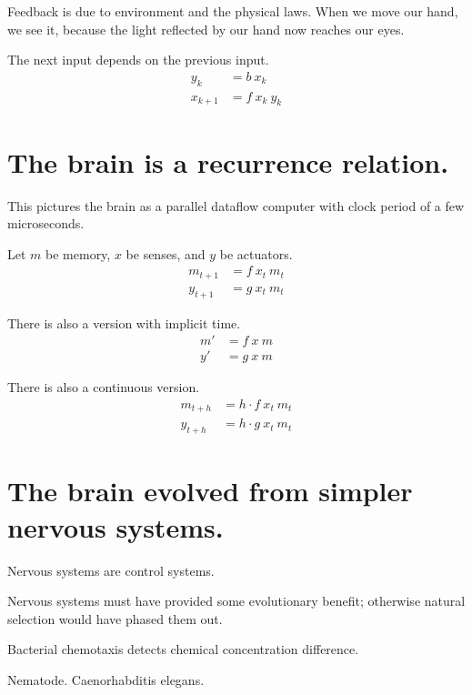 Feedback is due to environment and the physical laws.
When we move our hand, we see it, because the light
reflected by our hand now reaches our eyes.

The next input depends on the previous input.
\begin{align*}
    y_k &= b~x_k
    \\
    x_{k+1} &= f~x_k~y_k
\end{align*}

\section{The brain is a recurrence relation.}

This pictures the brain as a parallel dataflow computer
with clock period of a few microseconds.


Let \(m\) be memory, \(x\) be senses, and \(y\) be actuators.
\begin{align*}
    m_{t+1} &= f~x_t~m_t
    \\
    y_{t+1} &= g~x_t~m_t
\end{align*}

There is also a version with implicit time.
\begin{align*}
    m' &= f~x~m
    \\
    y' &= g~x~m
\end{align*}

There is also a continuous version.
\begin{align*}
    m_{t+h} &= h \cdot f~x_t~m_t
    \\
    y_{t+h} &= h \cdot g~x_t~m_t
\end{align*}

\section{The brain evolved from simpler nervous systems.}

Nervous systems are control systems.

Nervous systems must have provided some evolutionary benefit;
otherwise natural selection would have phased them out.

Bacterial chemotaxis detects chemical concentration difference.

Nematode.
Caenorhabditis elegans.
